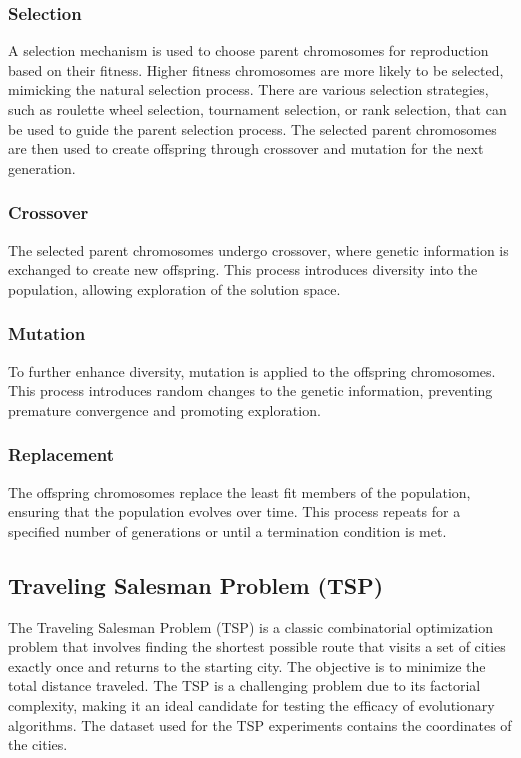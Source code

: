 \documentclass[conference]{IEEEtran}
\begin{document}
\subsubsection{Selection}
A selection mechanism is used to choose parent chromosomes for reproduction
based on their fitness. Higher fitness chromosomes are more likely to be
selected, mimicking the natural selection process. There are various selection
strategies, such as roulette wheel selection, tournament selection, or rank
selection, that can be used to guide the parent selection process. The selected
parent chromosomes are then used to create offspring through crossover and
mutation for the next generation.

\subsubsection{Crossover}
The selected parent chromosomes undergo crossover, where genetic information is
exchanged to create new offspring. This process introduces diversity into the
population, allowing exploration of the solution space.

\subsubsection{Mutation}
To further enhance diversity, mutation is applied to the offspring chromosomes.
This process introduces random changes to the genetic information, preventing
premature convergence and promoting exploration.

\subsubsection{Replacement}
The offspring chromosomes replace the least fit members of the population,
ensuring that the population evolves over time. This process repeats for a
specified number of generations or until a termination condition is met.

\subsection{Traveling Salesman Problem (TSP)}
The Traveling Salesman Problem (TSP) is a classic combinatorial optimization
problem that involves finding the shortest possible route that visits a set of
cities exactly once and returns to the starting city. The objective is to
minimize the total distance traveled. The TSP is a challenging problem due to
its factorial complexity, making it an ideal candidate for testing the efficacy
of evolutionary algorithms. The dataset used for the TSP experiments contains
the coordinates of the cities.
\end{document}
